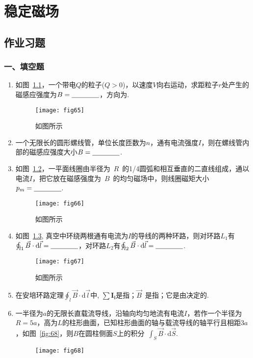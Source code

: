 \chapter{稳定磁场}
\section{作业习题}
\subsection*{一、填空题}
\begin{enumerate}
    \item 如图~\ref{fig:65}，一个带电$Q$的粒子($Q>0$)，以速度$V$向右运动，求距粒子$r$处产生的磁感应强度为$B=\nl$，方向为\nl.
    \begin{figure}[H]
        \centering
        \texttt{[image: fig65]}
        \caption{如图所示}\label{fig:65}
    \end{figure}
    \item 一个无限长的圆形螺线管，单位长度匝数为$n$，通有电流强度$I$，则在螺线管内部的磁感应强度大小$B=\nl$.
    \item 如图~\ref{fig:66}，一平面线圈由半径为~$R$~的1/4圆弧和相互垂直的二直线组成，通以电流$I$，把它放在磁感强度为~$B$~的均匀磁场中，则线圈磁矩大小$p_m=\nl$.
    \begin{figure}[H]
        \centering
        \texttt{[image: fig66]}
        \caption{如图所示}\label{fig:66}
    \end{figure}
    \item 如图~\ref{fig:67}, 真空中环绕两根通有电流为$I$的导线的两种环路，则对环路$L_1$有$\oint_{l1}\vec{B}\cdot \mathrm{d}\vec{l}=\nl$，对环路$L_2$有$\oint_{l2}\vec{B}\cdot \mathrm{d}\vec{l}=\nl$.
    \begin{figure}[H]
        \centering
        \texttt{[image: fig67]}
        \caption{如图所示}\label{fig:67}
    \end{figure}
    \item 在安培环路定理$\oint_{l} \vec{B}\cdot \mathrm{d}\vec{l}$中, $\sum \mathbf{I_i}$是指\nl；$\vec{B}$~是指\nl；它是由\nl 决定的.
    \item 一半径为$a$的无限长直载流导线，沿轴向均匀地流有电流$I$，若作一个半径为$R=5a$，高为$L$的柱形曲面，已知柱形曲面的轴与载流导线的轴平行且相距$3a$，如图~\ref{fig:68}，则$B$在圆柱侧面$S$上的积分~$\int_S \vec{B}\cdot \mathrm{d} \vec{S}$.
    \begin{figure}[H]
        \centering
        \texttt{[image: fig68]}

\end{figure}
\end{enumerate}
